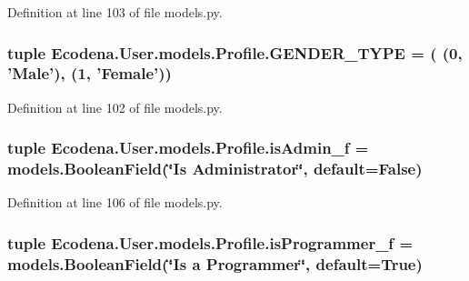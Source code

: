 Definition at line 103 of file models.py.

\hypertarget{class_ecodena_1_1_user_1_1models_1_1_profile_ab5f64a30a5708c602dd1eef94ccd811d}{
\subsubsection[{GENDER\_\-TYPE}]{\setlength{\rightskip}{0pt plus 5cm}tuple {\bf Ecodena.User.models.Profile.GENDER\_\-TYPE} = ( (0, 'Male'), (1, 'Female'))}}
\label{d2/de8/class_ecodena_1_1_user_1_1models_1_1_profile_ab5f64a30a5708c602dd1eef94ccd811d}


Definition at line 102 of file models.py.

\hypertarget{class_ecodena_1_1_user_1_1models_1_1_profile_ada687883f8de1aa44a0feee2448b61b8}{
\subsubsection[{isAdmin\_\-f}]{\setlength{\rightskip}{0pt plus 5cm}tuple {\bf Ecodena.User.models.Profile.isAdmin\_\-f} = models.BooleanField(\char`\"{}Is Administrator\char`\"{}, default=False)}}
\label{d2/de8/class_ecodena_1_1_user_1_1models_1_1_profile_ada687883f8de1aa44a0feee2448b61b8}


Definition at line 106 of file models.py.

\hypertarget{class_ecodena_1_1_user_1_1models_1_1_profile_ab696510431c027177451da1e4a6bdc0b}{
\subsubsection[{isProgrammer\_\-f}]{\setlength{\rightskip}{0pt plus 5cm}tuple {\bf Ecodena.User.models.Profile.isProgrammer\_\-f} = models.BooleanField(\char`\"{}Is a {\bf Programmer}\char`\"{}, default=True)}}
\label{d2/de8/class_ecodena_1_1_user_1_1models_1_1_profile_ab696510431c027177451da1e4a6bdc0b}


